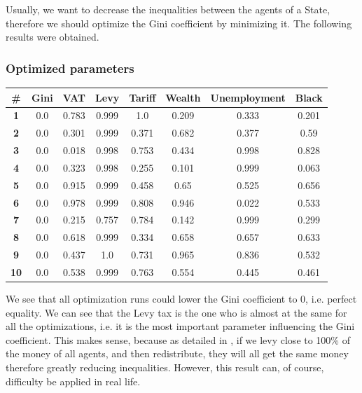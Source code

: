         Usually, we want to decrease the inequalities between the agents of a State, therefore we should optimize the Gini coefficient by minimizing it. The following results were obtained.
    
        \subsubsection{Optimized parameters}

            \begin{table}[H]
            \centering
            \begin{tabular}{|c|c|c|c|c|c|c|c|}
                \hline
                \textbf{\#} & \textbf{Gini}  & \textbf{VAT} & \textbf{Levy} & \textbf{Tariff} & \textbf{Wealth} & \textbf{Unemployment} & \textbf{Black} \\ \hline
                \textbf{1} & 0.0 & 0.783 & 0.999 & 1.0 & 0.209 & 0.333 & 0.201 \\ \hline
                \textbf{2} & 0.0 & 0.301 & 0.999 & 0.371 & 0.682 & 0.377 & 0.59 \\ \hline
                \textbf{3} & 0.0 & 0.018 & 0.998 & 0.753 & 0.434 & 0.998 & 0.828 \\ \hline
                \textbf{4} & 0.0 & 0.323 & 0.998 & 0.255 & 0.101 & 0.999 & 0.063 \\ \hline
                \textbf{5} & 0.0 & 0.915 & 0.999 & 0.458 & 0.65 & 0.525 & 0.656 \\ \hline
                \textbf{6} & 0.0 & 0.978 & 0.999 & 0.808 & 0.946 & 0.022 & 0.533 \\ \hline
                \textbf{7} & 0.0 & 0.215 & 0.757 & 0.784 & 0.142 & 0.999 & 0.299 \\ \hline
                \textbf{8} & 0.0 & 0.618 & 0.999 & 0.334 & 0.658 & 0.657 & 0.633 \\ \hline
                \textbf{9} & 0.0 & 0.437 & 1.0 & 0.731 & 0.965 & 0.836 & 0.532 \\ \hline
                \textbf{10} & 0.0 & 0.538 & 0.999 & 0.763 & 0.554 & 0.445 & 0.461 \\ \hline
            \end{tabular}
            \end{table}

            We see that all optimization runs could lower the Gini coefficient to 0, i.e. perfect equality. We can see that the Levy tax is the one who is almost at the same for all the optimizations, i.e. it is the most important parameter influencing the Gini coefficient.  This makes sense, because as detailed in , if we levy close to 100\% of the money of all agents, and then redistribute, they will all get the same money therefore greatly reducing inequalities. However, this result can, of course, difficulty be applied in real life. 
            
